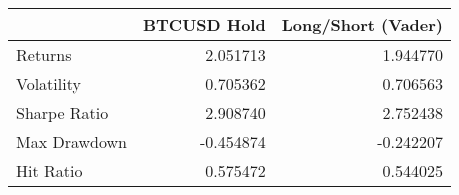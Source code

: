 \begin{tabular}{lrr}
\toprule
{} &  BTCUSD Hold &  Long/Short (Vader) \\
\midrule
Returns      &     2.051713 &            1.944770 \\
Volatility   &     0.705362 &            0.706563 \\
Sharpe Ratio &     2.908740 &            2.752438 \\
Max Drawdown &    -0.454874 &           -0.242207 \\
Hit Ratio    &     0.575472 &            0.544025 \\
\bottomrule
\end{tabular}
